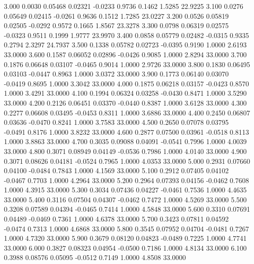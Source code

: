    3.000   0.0030   0.05468   0.02321  -0.0233   0.9736   0.1462   1.5285  22.9225
   3.100   0.0276   0.05649   0.02415  -0.0261   0.9636   0.1512   1.7285  23.0227
   3.200   0.0526   0.05819   0.02505  -0.0292   0.9572   0.1665   1.8567  23.3278
   3.300   0.0798   0.06319   0.02575  -0.0323   0.9511   0.1999   1.9777  23.9970
   3.400   0.0858   0.05779   0.02482  -0.0315   0.9335   0.2794   2.3297  24.7937
   3.500   0.1338   0.05782   0.02723  -0.0395   0.9190   1.0000   2.6193  33.0000
   3.600   0.1587   0.06052   0.02896  -0.0426   0.9085   1.0000   2.8294  33.0000
   3.700   0.1876   0.06648   0.03107  -0.0465   0.9014   1.0000   2.9726  33.0000
   3.800   0.1830   0.06495   0.03103  -0.0447   0.8963   1.0000   3.0372  33.0000
   3.900   0.1773   0.06140   0.03070  -0.0419   0.8695   1.0000   3.3042  33.0000
   4.000   0.1875   0.06218   0.03157  -0.0423   0.8570   1.0000   3.4291  33.0000
   4.100   0.1994   0.06324   0.03258  -0.0430   0.8471   1.0000   3.5290  33.0000
   4.200   0.2126   0.06451   0.03370  -0.0440   0.8387   1.0000   3.6128  33.0000
   4.300   0.2277   0.06608   0.03495  -0.0453   0.8311   1.0000   3.6886  33.0000
   4.400   0.2450   0.06807   0.03636  -0.0470   0.8241   1.0000   3.7583  33.0000
   4.500   0.2650   0.07078   0.03795  -0.0491   0.8176   1.0000   3.8232  33.0000
   4.600   0.2877   0.07500   0.03961  -0.0518   0.8113   1.0000   3.8863  33.0000
   4.700   0.3035   0.09088   0.04091  -0.0541   0.7996   1.0000   4.0039  33.0000
   4.800   0.3071   0.08949   0.04149  -0.0536   0.7986   1.0000   4.0140  33.0000
   4.900   0.3071   0.08626   0.04181  -0.0524   0.7965   1.0000   4.0353  33.0000
   5.000   0.2931   0.07660   0.04100  -0.0484   0.7843   1.0000   4.1569  33.0000
   5.100   0.2912   0.07405   0.04102  -0.0467   0.7703   1.0000   4.2964  33.0000
   5.200   0.2964   0.07393   0.04156  -0.0462   0.7608   1.0000   4.3915  33.0000
   5.300   0.3034   0.07436   0.04227  -0.0461   0.7536   1.0000   4.4635  33.0000
   5.400   0.3116   0.07504   0.04307  -0.0462   0.7472   1.0000   4.5269  33.0000
   5.500   0.3208   0.07589   0.04394  -0.0465   0.7414   1.0000   4.5848  33.0000
   5.600   0.3310   0.07691   0.04489  -0.0469   0.7361   1.0000   4.6378  33.0000
   5.700   0.3423   0.07811   0.04592  -0.0474   0.7313   1.0000   4.6868  33.0000
   5.800   0.3545   0.07952   0.04704  -0.0481   0.7267   1.0000   4.7320  33.0000
   5.900   0.3679   0.08120   0.04823  -0.0489   0.7225   1.0000   4.7741  33.0000
   6.000   0.3827   0.08323   0.04954  -0.0500   0.7186   1.0000   4.8134  33.0000
   6.100   0.3988   0.08576   0.05095  -0.0512   0.7149   1.0000   4.8508  33.0000
